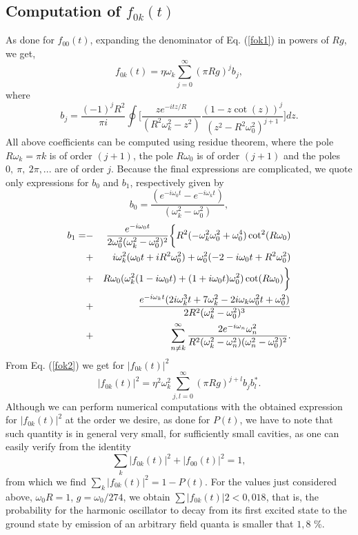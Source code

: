 \documentclass[10pt,english,twocolumn]{revtex4}
\begin{document}
\subsection{Computation of $f_{0k}(t)$}
%
As done for $f_{00}(t)$, expanding the denominator of Eq. (\ref{fok1}) in powers of $Rg$, we get,
%
\begin{equation}
f_ {0k}(t)=\eta \omega_k \sum_{j=0}^\infty (\pi Rg)^jb_j,
\label{fok2}
\end{equation}
%
where
%
\begin{equation}
b_j=
\frac{(-1)^j R^2}{\pi i } \oint\bigg[\frac {z e^{-itz/R} }{(R^2\omega_k^2-z^2)}  \frac { (1 - z\cot (z))^j} {(z^2 -
     R^2\omega_ 0^2)^{j+1}}\bigg] dz.
\label{bj}
\end{equation}
%
All above coefficients can be computed using residue theorem, where the pole $R\omega_k=\pi k$ is of order $(j+1)$,
the pole $R\omega_0$ is of order $(j+1)$ and the poles $0,~\pi,~2\pi,...$ are of order $j$. Because the final expressions
are complicated, we quote only expressions for $b_0$ and $b_1$, respectively given by
%
\begin{equation}
b_0=\frac{\left(e^{-i\omega_0 t}-e^{-i\omega_k t}\right)}
{\left(\omega_k^2-\omega_0^2\right)},
\label{b0}
\end{equation}
%
\begin{eqnarray}
b_1=&-&
\frac{e^{-i \omega_0 t }}{2\omega_0^2(\omega_k^2-\omega_0^2)^2}\bigg\{ R^2(-\omega_k^2\omega_0^2+ \omega_0^4) \cot^2(R\omega_0)
\nonumber\\
& +&i \omega_k^2 (\omega_0 t + i R^2\omega_0^2) 
+ \omega_0^2 (-2 - i \omega_0 t + R^2\omega_0^2)\cr
&+&R\omega_0 (\omega_k^2(1 - i \omega_0 t) + (1 + i \omega_0 t) \omega_0^2) \cot(R\omega_0)\bigg\}\cr
&+&\frac{e^{-i\omega_k t } (2 i \omega_k^3  t+7 \omega_k^2  -2 i \omega_k  \omega_0^2 t
+ \omega_0^2)}{2R^2(\omega_k^2-\omega_0^2)^3}\nonumber\\
&+&\sum_{n\neq k}^\infty\frac{2e^{-i\omega_n}\omega_n^2 }{R^2(\omega_k^2-\omega_n^2)
(\omega_n^2-\omega_0^2)^2}.
\label{b1}
\end{eqnarray}
%
%
From Eq. (\ref{fok2}) we get for  $|f_{0k}(t)|^2$
%
\begin{equation}
|f_{0k}(t)|^2=\eta^2\omega_k^2 \sum_{j,l=0}^\infty (\pi Rg)^{j+l} b_jb_l^\ast.
\label{|fok|}
\end{equation}
%
%
Although we can perform numerical computations with the obtained expression for $|f_{0k}(t)|^2$ at the
order we desire,  as done for $P(t)$, we have to note that such quantity is in general very small, for sufficiently small cavities, as one can
easily verify from the identity
%
\begin{equation}
\sum_{k}|f_{0k}(t)|^2+|f_{00}(t)|^2=1,
\label{ident}
\end{equation} 
%
from which we find $\sum_{k} |f_{0k}(t)|^2=1-P(t)$. For the values just considered above, $\omega_{0} R=1$, $g=\omega_0/274$,
we obtain $\sum|f_{0k}(t)|2<0,018$, that is, the probability for the harmonic oscillator to decay from its first excited state
to the ground state by emission of an arbitrary field quanta is smaller that $1,8$ \%. 
\end{document}
